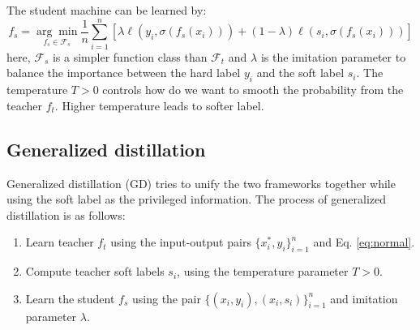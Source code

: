 The student machine can be learned by:
\begin{equation}\label{eq:distill}
f_s=\underset{f_s \in \mathcal{F}_s}{\arg \min}\frac{1}{n}\sum_{i=1}^{n}\left[\lambda\ell\left(y_i,\sigma(f_s(x_i))\right)+(1-\lambda)\ell\left(s_i,\sigma(f_s(x_i))\right)\right]
\end{equation}
here, $\mathcal{F}_s$ is a simpler function class than $\mathcal{F}_t$ and $\lambda$ is the imitation parameter to balance the importance between the hard label $y_i$ and the soft label $s_i$. The temperature $T>0$ controls how do we want to smooth the probability from the teacher $f_t$. Higher temperature leads to softer label.

\subsection{Generalized distillation}
Generalized distillation (GD) tries to unify the two frameworks together while using the soft label as the privileged information. The process of generalized distillation is as follows:

\begin{enumerate}
\item Learn teacher ${f}_t$ using the input-output pairs $\{x^*_i,y_i\}_{i=1}^n$ and Eq. \ref{eq:normal}.
\item Compute teacher soft labels $s_i$, using the temperature parameter $T > 0$.
\item Learn the student ${f}_s$ using the pair $\{\left(x_i,y_i\right),\left(x_i,s_i\right)\}_{i=1}^n$ and imitation parameter $\lambda$.
\end{enumerate}